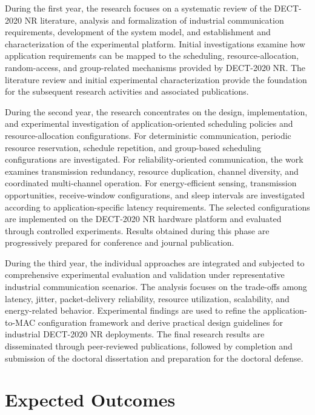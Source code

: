 \documentclass[12pt,a4paper]{article}
\begin{document}
During the first year, the research focuses on a systematic review of the
DECT-2020 NR literature, analysis and formalization of industrial communication
requirements, development of the system model, and establishment and
characterization of the experimental platform. Initial investigations examine
how application requirements can be mapped to the scheduling,
resource-allocation, random-access, and group-related mechanisms provided by
DECT-2020 NR. The literature review and initial experimental characterization
provide the foundation for the subsequent research activities and associated
publications.

During the second year, the research concentrates on the design,
implementation, and experimental investigation of application-oriented
scheduling policies and resource-allocation configurations. For deterministic
communication, periodic resource reservation, schedule repetition, and
group-based scheduling configurations are investigated. For
reliability-oriented communication, the work examines transmission redundancy,
resource duplication, channel diversity, and coordinated multi-channel
operation. For energy-efficient sensing, transmission opportunities,
receive-window configurations, and sleep intervals are investigated according
to application-specific latency requirements. The selected configurations are
implemented on the DECT-2020 NR hardware platform and evaluated through
controlled experiments. Results obtained during this phase are progressively
prepared for conference and journal publication.

During the third year, the individual approaches are integrated and subjected
to comprehensive experimental evaluation and validation under representative
industrial communication scenarios. The analysis focuses on the trade-offs
among latency, jitter, packet-delivery reliability, resource utilization,
scalability, and energy-related behavior. Experimental findings are used to
refine the application-to-MAC configuration framework and derive practical
design guidelines for industrial DECT-2020 NR deployments. The final research
results are disseminated through peer-reviewed publications, followed by
completion and submission of the doctoral dissertation and preparation for the
doctoral defense.



\section{ Expected Outcomes}
\label{sec:research_plan}
\end{document}
